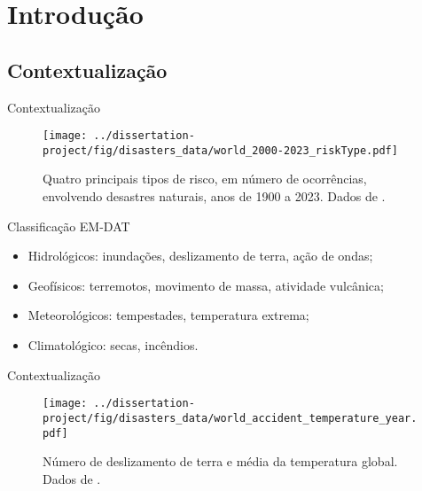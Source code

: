 \section{Introdução}

\subsection{Contextualização}


\begin{frame}{Contextualização}
    \begin{minipage}[c]{0.49\textwidth}
        \begin{figure}
            \centering
            \texttt{[image: ../dissertation-project/fig/disasters\_data/world\_2000-2023\_riskType.pdf]}
            \caption{Quatro principais tipos de risco, em número de ocorrências, envolvendo
            desastres naturais, anos de 1900 a 2023. Dados de \cite{emdat_2023}.}
        \end{figure}    
    \end{minipage}
    \hfill
    \begin{minipage}[c]{0.40\textwidth}
        \begin{exampleblock}{\small Classificação EM-DAT}
            \begin{itemize}
                \scriptsize
                \item Hidrológicos: inundações, deslizamento de terra, ação de ondas;
                \item Geofísicos: terremotos, movimento de massa, atividade vulcânica;
                \item Meteorológicos: tempestades, temperatura extrema;
                \item Climatológico: secas, incêndios. 
            \end{itemize}
        \end{exampleblock}
    \end{minipage}
\end{frame}

\begin{frame}{Contextualização}
    \begin{figure}
        \centering
        \texttt{[image: ../dissertation-project/fig/disasters\_data/world\_accident\_temperature\_year.pdf]}
        \caption{Número de deslizamento de terra e média da temperatura global. Dados de \cite{emdat_2023,NASA/GISS}.}
    \end{figure}
\end{frame}

